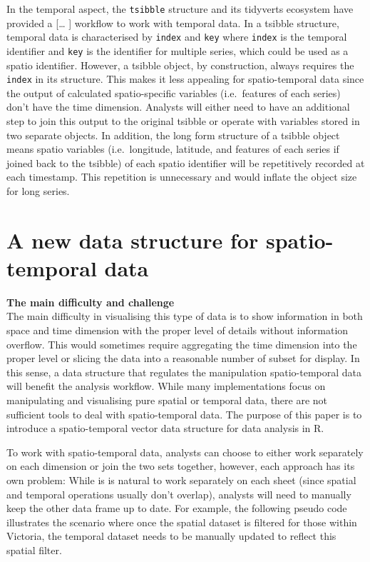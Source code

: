 \documentclass[
]{jss}
\begin{document}
In the temporal aspect, the \texttt{tsibble} \citep{tsibbles} structure
and its tidyverts ecosystem have provided a {[}\ldots{} {]} workflow to
work with temporal data. In a tsibble structure, temporal data is
characterised by \texttt{index} and \texttt{key} where \texttt{index} is
the temporal identifier and \texttt{key} is the identifier for multiple
series, which could be used as a spatio identifier. However, a tsibble
object, by construction, always requires the \texttt{index} in its
structure. This makes it less appealing for spatio-temporal data since
the output of calculated spatio-specific variables (i.e.~features of
each series) don't have the time dimension. Analysts will either need to
have an additional step to join this output to the original tsibble or
operate with variables stored in two separate objects. In addition, the
long form structure of a tsibble object means spatio variables
(i.e.~longitude, latitude, and features of each series if joined back to
the tsibble) of each spatio identifier will be repetitively recorded at
each timestamp. This repetition is unnecessary and would inflate the
object size for long series.

\hypertarget{a-new-data-structure-for-spatio-temporal-data}{%
\section{A new data structure for spatio-temporal
data}\label{a-new-data-structure-for-spatio-temporal-data}}

\textbf{The main difficulty and challenge}\\
The main difficulty in visualising this type of data is to show
information in both space and time dimension with the proper level of
details without information overflow. This would sometimes require
aggregating the time dimension into the proper level or slicing the data
into a reasonable number of subset for display. In this sense, a data
structure that regulates the manipulation spatio-temporal data will
benefit the analysis workflow. While many implementations focus on
manipulating and visualising pure spatial or temporal data, there are
not sufficient tools to deal with spatio-temporal data. The purpose of
this paper is to introduce a spatio-temporal vector data structure for
data analysis in R.

To work with spatio-temporal data, analysts can choose to either work
separately on each dimension or join the two sets together, however,
each approach has its own problem: While is is natural to work
separately on each sheet (since spatial and temporal operations usually
don't overlap), analysts will need to manually keep the other data frame
up to date. For example, the following pseudo code illustrates the
scenario where once the spatial dataset is filtered for those within
Victoria, the temporal dataset needs to be manually updated to reflect
this spatial filter.
\end{document}

